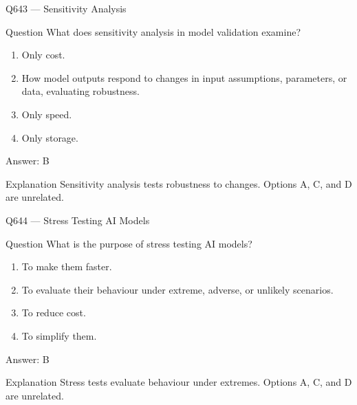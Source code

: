\documentclass[aspectratio=169,8pt]{beamer}
\begin{document}
	\begin{frame}{Q643 --- Sensitivity Analysis}
		\begin{block}{Question}
			What does sensitivity analysis in model validation examine?
			\begin{enumerate}
				\item Only cost.
				\item How model outputs respond to changes in input assumptions, parameters, or data, evaluating robustness.
				\item Only speed.
				\item Only storage.
			\end{enumerate}
		\end{block}
		\begin{exampleblock}{Answer: B}\end{exampleblock}
		\begin{block}{Explanation}
			Sensitivity analysis tests robustness to changes. Options A, C, and D are unrelated.
		\end{block}
	\end{frame}
	
	\begin{frame}{Q644 --- Stress Testing AI Models}
		\begin{block}{Question}
			What is the purpose of stress testing AI models?
			\begin{enumerate}
				\item To make them faster.
				\item To evaluate their behaviour under extreme, adverse, or unlikely scenarios.
				\item To reduce cost.
				\item To simplify them.
			\end{enumerate}
		\end{block}
		\begin{exampleblock}{Answer: B}\end{exampleblock}
		\begin{block}{Explanation}
			Stress tests evaluate behaviour under extremes. Options A, C, and D are unrelated.
		\end{block}
	\end{frame}
	
\end{document}
